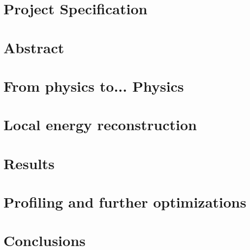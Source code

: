 \documentclass[a4paper,10pt,twoside]{report}
\author{\me}
\begin{document}




\normalsize

\newpage

\chapter*{\textcolor{OpenlabDarkBlue}{Project Specification} }\label{chapter:specification}


\chapter*{\textcolor{OpenlabDarkBlue}{Abstract}} \label{chapter:abstract}


\begingroup
\color{OpenlabDarkBlue}
\tableofcontents
\endgroup

\listoffigures

\listoftables

\lstlistoflistings


\clearpage

\setcounter{page}{10}
\chapter{From physics to... Physics}\label{chapter:01}


\chapter{Local energy reconstruction}\label{chapter:02}

\chapter{Results}\label{chapter:03}

\chapter{Profiling and further optimizations}\label{chapter:04}


\chapter{Conclusions}\label{chapter:conclusions}


%



\clearpage %
\appendix
{} %


\end{document}

